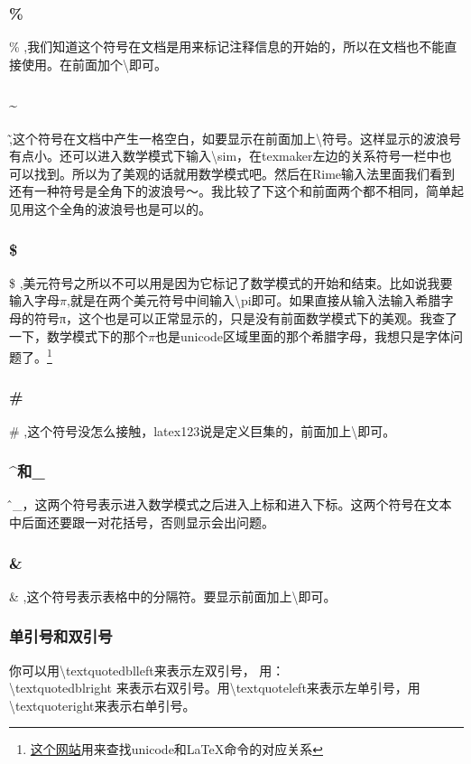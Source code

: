 \documentclass[12pt,oneside]{book}
\begin{document}
\begin{common-format}
\subsubsection{\%}
\% ,我们知道这个符号在文档是用来标记注释信息的开始的，所以在文档也不能直接使用。在前面加个\textbackslash 即可。

\subsubsection{\~{}}
\~ ,这个符号在文档中产生一格空白，如要显示在前面加上\textbackslash 符号。这样显示的波浪号有点小。还可以进入数学模式下输入\textbackslash sim，在texmaker左边的关系符号一栏中也可以找到。所以为了美观的话就用数学模式吧。然后在Rime输入法里面我们看到还有一种符号是全角下的波浪号～。我比较了下这个和前面两个都不相同，简单起见用这个全角的波浪号也是可以的。

\subsubsection{\$}
\$ ,美元符号之所以不可以用是因为它标记了数学模式的开始和结束。比如说我要输入字母$\pi$,就是在两个美元符号中间输入\textbackslash pi即可。如果直接从输入法输入希腊字母的符号π，这个也是可以正常显示的，只是没有前面数学模式下的美观。我查了一下，数学模式下的那个$\pi$也是unicode区域里面的那个希腊字母，我想只是字体问题了。\footnote{\href{http://www.johndcook.com/unicode_latex.html}{这个网站}用来查找unicode和\LaTeX 命令的对应关系}

\subsubsection{\#}
\# ,这个符号没怎么接触，latex123说是定义巨集的，前面加上\textbackslash 即可。

\subsubsection{\^{}和\_{}}
\^和\_{}，这两个符号表示进入数学模式之后进入上标和进入下标。这两个符号在文本中后面还要跟一对花括号，否则显示会出问题。

\subsubsection{\&}
\& ,这个符号表示表格中的分隔符。要显示前面加上\textbackslash 即可。

\subsubsection{单引号和双引号}
你可以用\textbackslash textquotedblleft来表示左双引号， 用：\\
\textbackslash textquotedblright 来表示右双引号。用\textbackslash textquoteleft来表示左单引号，用\textbackslash textquoteright来表示右单引号。


\end{common-format}
\end{document}
